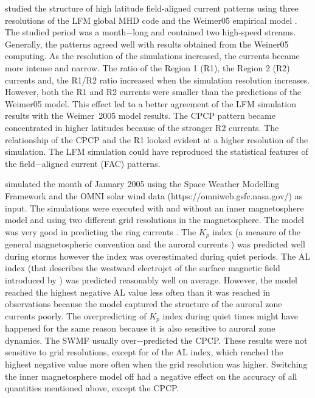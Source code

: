 \documentclass[linenumbers,draft]{agujournal}
\begin{document}
\citet{wiltberger17:_struc_high_latit_curren_magnet_ionos_model} studied the structure of high latitude field-aligned current patterns using three resolutions of the LFM global MHD code and the Weimer05 empirical model \citep{weimer05:_improv_joule}. The studied period was a month$-$long and contained two high-speed streams. Generally, the patterns agreed well with results obtained from the Weiner05 computing. As the resolution of the simulations increased, the currents became more intense and narrow. The ratio of the Region 1 (R1), the Region 2 (R2) currents and, the R1/R2 ratio increased when the simulation resolution increases. However, both the R1 and R2 currents were smaller than the predictions of the Weimer05 model. This effect led to a better agreement of the LFM simulation results with the Weimer~2005 model results. The CPCP pattern became concentrated in higher latitudes because of the stronger R2 currents. The relationship of the CPCP and the R1 looked evident at a higher resolution of the simulation. The LFM simulation could have reproduced the statistical features of the field$-$aligned current (FAC) patterns. 

\citet{haiducek17:_swmf_global_magnet_simul_januar} simulated the month of January 2005 using the Space Weather Modelling Framework \citep[SWMF;][]{toth05:_space_weath_model_framew} and the OMNI solar wind data (https://omniweb.gsfc.nasa.gov/) as input. The simulations were executed with and without an inner magnetosphere model and using two different grid resolutions in the magnetosphere. The model was very good in predicting the ring currents \citep[SYM-H; http://wdc.kugi.kyoto-u.ac.jp/aeasy/asy.pdf;][]{iyemori90:_storm}. The $K_p$ index (a measure of the general magnetospheric convention and the auroral currents \citep{bartels39,rostoker72:_geomag,thomsen04:_why_kp}) was predicted well during storms however the index was overestimated during quiet periods. The AL index (that describes the westward electrojet of the surface magnetic field introduced by \citet{davis66:_auror_ae}) was predicted reasonably well on average. However, the model reached the highest negative AL value less often than it was reached in observations because the model captured the structure of the auroral zone currents poorly. The overpredicting of $K_p$ index during quiet times might have happened for the same reason because it is also sensitive to auroral zone dynamics. The SWMF usually over$-$predicted the CPCP. These results were not sensitive to grid resolutions, except for of the AL index, which reached the highest negative value more often when the grid resolution was higher. Switching the inner magnetosphere model off had a negative effect on the accuracy of all quantities mentioned above, except the CPCP. 
\end{document}
